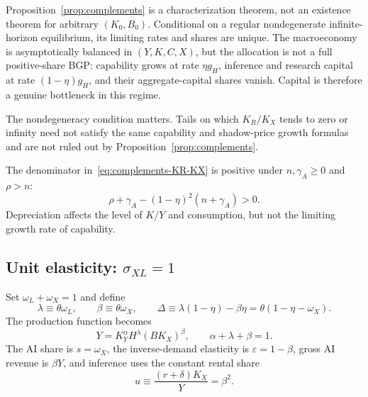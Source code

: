 Proposition~\ref{prop:complements} is a characterization theorem, not an existence theorem for arbitrary $(K_0,B_0)$. Conditional on a regular nondegenerate infinite-horizon equilibrium, its limiting rates and shares are unique. The macroeconomy is asymptotically balanced in $(Y,K,C,X)$, but the allocation is not a full positive-share BGP: capability grows at rate $\eta g_H$, inference and research capital at rate $(1-\eta)g_H$, and their aggregate-capital shares vanish. Capital is therefore a genuine bottleneck in this regime.

The nondegeneracy condition matters. Tails on which $K_R/K_X$ tends to zero or infinity need not satisfy the same capability and shadow-price growth formulas and are not ruled out by Proposition~\ref{prop:complements}.

The denominator in~\eqref{eq:complements-KR-KX} is positive under $n,\gamma_A\geq0$ and $\rho>n$:
\[
 \rho+\gamma_A-(1-\eta)^2(n+\gamma_A)>0.
\]
Depreciation affects the level of $K/Y$ and consumption, but not the limiting growth rate of capability.

\subsection{Unit elasticity: \texorpdfstring{$\sigma_{XL}=1$}{sigmaXL=1}}

Set $\omega_L+\omega_X=1$ and define
\begin{equation}
 \lambda\equiv\theta\omega_L,\qquad
 \beta\equiv\theta\omega_X,\qquad
 \Delta\equiv\lambda(1-\eta)-\beta\eta
 =\theta(1-\eta-\omega_X).
 \label{eq:unit-definitions}
\end{equation}
The production function becomes
\begin{equation}
 Y=K_Y^\alpha H^\lambda(BK_X)^\beta,
 \qquad \alpha+\lambda+\beta=1.
 \label{eq:unit-production}
\end{equation}
The AI share is $s=\omega_X$, the inverse-demand elasticity is
$\varepsilon=1-\beta$, gross AI revenue is $\beta Y$, and inference uses the constant rental share
\begin{equation}
 u\equiv\frac{(r+\delta)K_X}{Y}=\beta^2.
 \label{eq:unit-u}
\end{equation}


